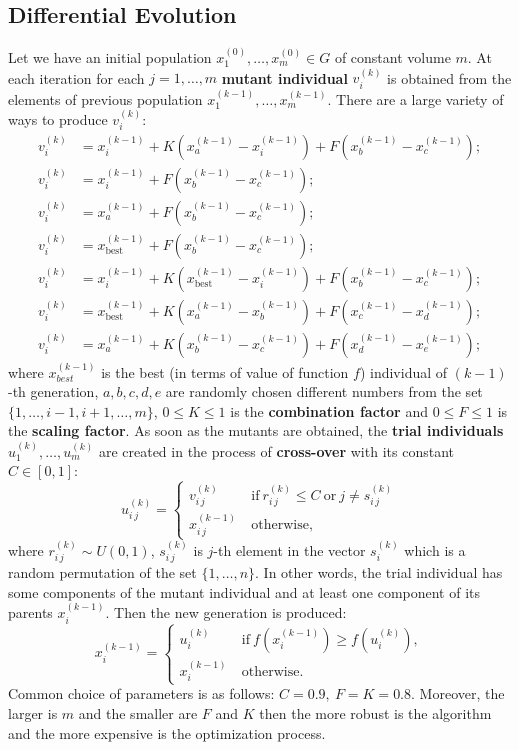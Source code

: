 \documentclass[12pt, bachelor, substylefile = algo_title.rtx]{disser}
\theoremstyle{definition}
\begin{document}
\subsection{Differential Evolution}
Let we have an initial population $x^{(0)}_1, \dots, x^{(0)}_m \in G$ of constant volume $m$. At each iteration for each $j = 1, \dots, m$ \textbf{mutant individual} $v^{(k)}_i$ is obtained from the elements of previous population $x^{(k-1)}_1, \dots, x^{(k-1)}_m$. There are a large variety of ways to produce $v^{(k)}_i$:
\begin{align}
v^{(k)}_i & = x^{(k-1)}_i + K (x^{(k-1)}_a - x^{(k-1)}_i) + F(x^{(k-1)}_b - x^{(k-1)}_c);\\
v^{(k)}_i & = x^{(k-1)}_i + F(x^{(k-1)}_b - x^{(k-1)}_c);\\
v^{(k)}_i & = x^{(k-1)}_a + F(x^{(k-1)}_b - x^{(k-1)}_c);\\
v^{(k)}_i & = x^{(k-1)}_{\text{best}} + F(x^{(k-1)}_b - x^{(k-1)}_c);\\
v^{(k)}_i & = x^{(k-1)}_i + K (x^{(k-1)}_{\text{best}} - x^{(k-1)}_i) + F(x^{(k-1)}_b - x^{(k-1)}_c);\\
v^{(k)}_i & = x^{(k-1)}_{\text{best}} + K (x^{(k-1)}_a - x^{(k-1)}_b) + F(x^{(k-1)}_c - x^{(k-1)}_d);\\
v^{(k)}_i & = x^{(k-1)}_a+ K (x^{(k-1)}_b - x^{(k-1)}_c) + F(x^{(k-1)}_d - x^{(k-1)}_e);
\end{align}
where $x^{(k-1)}_{best}$ is the best (in terms of value of function $f$) individual of $(k-1)$-th generation, $a,b,c,d,e$ are randomly chosen different numbers from the set $\{1,\dots, i-1, i+1, \dots, m\}$, $0\le K \le 1$ is the \textbf{combination factor} and $0 \le F \le 1$ is the \textbf{scaling factor}. As soon as the mutants are obtained, the \textbf{trial individuals} $u^{(k)}_1, \dots, u^{(k)}_m$ are created in the process of \textbf{cross-over} with its constant $C \in [0, 1]$:
\[ u^{(k)}_{i\,j} = 
\begin{cases}
v^{(k)}_{i\,j} &\ \text{if}\ r^{(k)}_{i\,j} \le C\ \text{or}\ j  \ne s^{(k)}_{i\,j}\\
x^{(k-1)}_{i\,j} &\ \text{otherwise},
\end{cases}
 \]
where $r^{(k)}_{i\,j} \sim U(0, 1)$, $s^{(k)}_{i\,j}$ is $j$-th element in the vector $s^{(k)}_{i}$ which is a random permutation of the set $\{1, \dots, n\}$. In other words, the trial individual has some components of the mutant individual and at least one component of its parents $x^{(k-1)}_{i}$. 
Then the new generation is produced:
\[ x^{(k-1)}_{i} = 
\begin{cases}
u^{(k)}_{i} &\ \text{if}\ f( x^{(k-1)}_{i}) \ge  f(u^{(k)}_{i}),\\
x^{(k-1)}_{i} &\ \text{otherwise}.
\end{cases}
 \]
Common choice of parameters is as follows: $C = 0.9,\ F = K = 0.8$. Moreover, the larger is $m$ and the smaller are $F$ and $K$ then the more robust is the algorithm and the more expensive is the optimization process.
\end{document}
